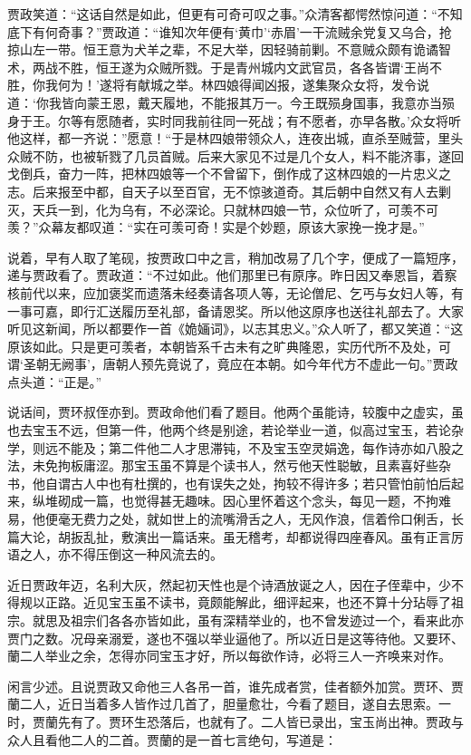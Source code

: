 \documentclass[12pt,oneside]{book}
\begin{document}
贾政笑道：“这话自然是如此，但更有可奇可叹之事。”众清客都愕然惊问道：“不知底下有何奇事？”贾政道：“谁知次年便有‘黄巾’‘赤眉’一干流贼余党复又乌合，抢掠山左一带。恒王意为犬羊之辈，不足大举，因轻骑前剿。不意贼众颇有诡谲智术，两战不胜，恒王遂为众贼所戮。于是青州城内文武官员，各各皆谓‘王尚不胜，你我何为！’遂将有献城之举。林四娘得闻凶报，遂集聚众女将，发令说道：‘你我皆向蒙王恩，戴天履地，不能报其万一。今王既殒身国事，我意亦当殒身于王。尔等有愿随者，实时同我前往同一死战；有不愿者，亦早各散。’众女将听他这样，都一齐说：”愿意！“于是林四娘带领众人，连夜出城，直杀至贼营，里头众贼不防，也被斩戮了几员首贼。后来大家见不过是几个女人，料不能济事，遂回戈倒兵，奋力一阵，把林四娘等一个不曾留下，倒作成了这林四娘的一片忠义之志。后来报至中都，自天子以至百官，无不惊骇道奇。其后朝中自然又有人去剿灭，天兵一到，化为乌有，不必深论。只就林四娘一节，众位听了，可羡不可羡？”众幕友都叹道：“实在可羡可奇！实是个妙题，原该大家挽一挽才是。”

说着，早有人取了笔砚，按贾政口中之言，稍加改易了几个字，便成了一篇短序，递与贾政看了。贾政道：“不过如此。他们那里已有原序。昨日因又奉恩旨，着察核前代以来，应加褒奖而遗落未经奏请各项人等，无论僧尼、乞丐与女妇人等，有一事可嘉，即行汇送履历至礼部，备请恩奖。所以他这原序也送往礼部去了。大家听见这新闻，所以都要作一首《姽婳词》，以志其忠义。”众人听了，都又笑道：“这原该如此。只是更可羡者，本朝皆系千古未有之旷典隆恩，实历代所不及处，可谓‘圣朝无阙事’，唐朝人预先竟说了，竟应在本朝。如今年代方不虚此一句。”贾政点头道：“正是。”

说话间，贾环叔侄亦到。贾政命他们看了题目。他两个虽能诗，较腹中之虚实，虽也去宝玉不远，但第一件，他两个终是别途，若论举业一道，似高过宝玉，若论杂学，则远不能及；第二件他二人才思滞钝，不及宝玉空灵娟逸，每作诗亦如八股之法，未免拘板庸涩。那宝玉虽不算是个读书人，然亏他天性聪敏，且素喜好些杂书，他自谓古人中也有杜撰的，也有误失之处，拘较不得许多；若只管怕前怕后起来，纵堆砌成一篇，也觉得甚无趣味。因心里怀着这个念头，每见一题，不拘难易，他便毫无费力之处，就如世上的流嘴滑舌之人，无风作浪，信着伶口俐舌，长篇大论，胡扳乱扯，敷演出一篇话来。虽无稽考，却都说得四座春风。虽有正言厉语之人，亦不得压倒这一种风流去的。

近日贾政年迈，名利大灰，然起初天性也是个诗酒放诞之人，因在子侄辈中，少不得规以正路。近见宝玉虽不读书，竟颇能解此，细评起来，也还不算十分玷辱了祖宗。就思及祖宗们各各亦皆如此，虽有深精举业的，也不曾发迹过一个，看来此亦贾门之数。况母亲溺爱，遂也不强以举业逼他了。所以近日是这等待他。又要环、蘭二人举业之余，怎得亦同宝玉才好，所以每欲作诗，必将三人一齐唤来对作。

闲言少述。且说贾政又命他三人各吊一首，谁先成者赏，佳者额外加赏。贾环、贾蘭二人，近日当着多人皆作过几首了，胆量愈壮，今看了题目，遂自去思索。一时，贾蘭先有了。贾环生恐落后，也就有了。二人皆已录出，宝玉尚出神。贾政与众人且看他二人的二首。贾蘭的是一首七言绝句，写道是：
\end{document}
